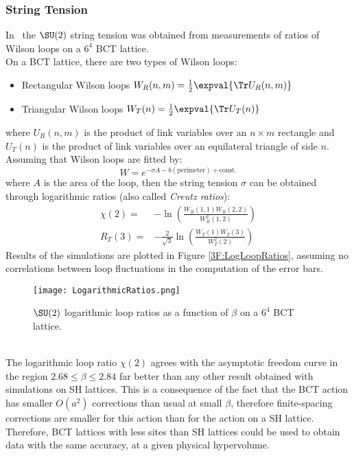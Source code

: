 \subsubsection{String Tension}
In~\cite{Celmaster:1983hs} the $\SU(2)$ string tension was obtained from measurements of ratios of Wilson loops on a $6^4$ BCT lattice.\\
On a BCT lattice, there are two types of Wilson loops:
\begin{itemize}
    \item Rectangular Wilson loops $W_R(n,m)=\frac12\expval{\Tr U_R(n,m)}$\
    \item Triangular Wilson loops $W_T(n)=\frac12\expval{\Tr U_T(n)}$
\end{itemize}
where $U_R(n,m)$ is the product of link variables over an $n\times m$ rectangle and $U_T(n)$ is the product of link variables over an equilateral triangle of side $n$.\\
Assuming that Wilson loops are fitted by:
\begin{equation}
    W = e^{-\sigma A -b(\text{perimeter}) +\text{const.}} \label{3:WilsonFit}
\end{equation}
where $A$ is the area of the loop, then the string tension $\sigma$ can be obtained through logarithmic ratios (also called \emph{Creutz ratios}):
\begin{align}
    \chi(2) =& -\ln(\frac{W_R(1,1)W_R(2,2)}{W_R^2(1,2)}) \\
    R_T(3) =& -\frac{2}{\sqrt3}\ln(\frac{W_T(1)W_T(3)}{W_T^2(2)})
\end{align}
Results of the simulations are plotted in Figure \eqref{3F:LogLoopRatios}, assuming no correlations between loop fluctuations in the computation of the error bars.
\begin{figure}[!htbp]
    \centering
    \texttt{[image: LogarithmicRatios.png]}
    \caption{$\SU(2)$ logarithmic loop ratios as a function of $\beta$ on a $6^4$ BCT lattice.}
    \label{3F:LogLoopRatios}
\end{figure}\\
The logarithmic loop ratio $\chi(2)$ agrees with the asymptotic freedom curve in the region $2.68\leq\beta\leq2.84$ far better than any other result obtained with simulations on SH lattices.
This is a consequence of the fact that the BCT action has smaller $O(a^2)$ corrections than usual at small $\beta$, therefore finite-spacing corrections are smaller for this action than for the action on a SH lattice.
Therefore, BCT lattices with less sites than SH lattices could be used to obtain data with the same accuracy, at a given physical hypervolume.\\
